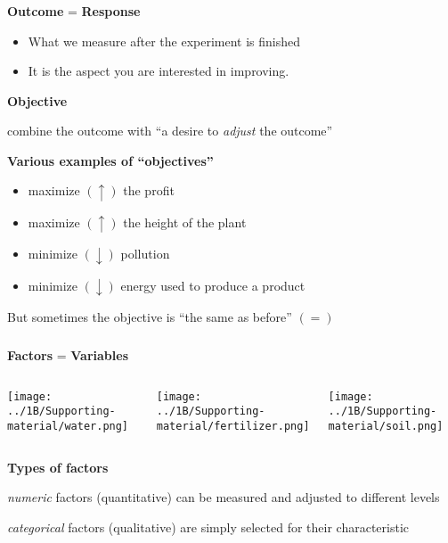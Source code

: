 \documentclass[handout,11pt,aspectratio=169,mathserif]{beamer}
\begin{document}
\begin{frame}\frametitle{}

	\textbf{{\color{purple} Outcome}} = \textbf{{\color{purple} Response}}
		\begin{itemize}
			\item	What we measure after the experiment is finished
			\item	It is the aspect you are interested in improving.
		\end{itemize}

	\vspace{12pt}
	\pause

	\textbf{{\color{purple} Objective}}


		\qquad combine the {\color{purple} outcome} with ``a desire to \emph{adjust} the outcome''
	\vspace{24pt}
	\pause

	{\textbf{{Various examples of ``objectives''}}}

		\begin{itemize}
			\item	maximize $(\uparrow)$ the profit
			\item	maximize $(\uparrow)$ the height of the plant
			\item	minimize $(\downarrow)$ pollution
			\item	minimize $(\downarrow)$ energy used to produce a product
		\end{itemize}

	\pause
		\vspace{12pt}
		But sometimes the objective is ``the same as before'' $(=)$
\end{frame}

\begin{frame}\frametitle{}

	\textbf{{\color{purple} Factors}}  = \textbf{{\color{purple} Variables}}
	

		\begin{columns}[T]
				\centerline{\texttt{[image: ../1B/Supporting-material/water.png]}}


				\centerline{\texttt{[image: ../1B/Supporting-material/fertilizer.png]}}


				\centerline{\texttt{[image: ../1B/Supporting-material/soil.png]}}

		\end{columns}


	\vspace{24pt}

	
	\textbf{{\color{purple} Types of factors}}

	\vspace{12pt}
	\qquad \emph{numeric} factors (quantitative) can be measured and adjusted to different levels

	\qquad \qquad
	\vspace{12pt}

	\qquad \emph{categorical} factors (qualitative) are simply selected for their characteristic



\end{frame}
\end{document}
